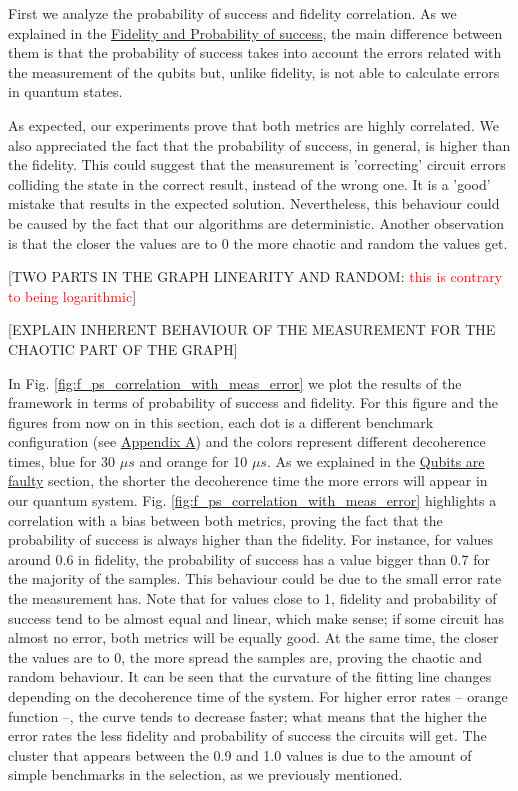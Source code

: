 First we analyze the probability of success and fidelity correlation.
As we explained in the \hyperref[sec:org0c7b2c2]{Fidelity and Probability of success}, the main difference between them is that the probability of success takes into account the errors related with the measurement of the qubits but, unlike fidelity, is not able to calculate errors in quantum states.

As expected, our experiments prove that both metrics are highly correlated.
We also appreciated the fact that the probability of success, in general, is higher than the fidelity.
This could suggest that the measurement is 'correcting' circuit errors colliding the state in the correct result, instead of the wrong one.
It is a 'good' mistake that results in the expected solution.
Nevertheless, this behaviour could be caused by the fact that our algorithms are deterministic.
Another observation is that the closer the values are to 0 the more chaotic and random the values get.



[TWO PARTS IN THE GRAPH  LINEARITY AND RANDOM: \textcolor{red}{this is contrary to being logarithmic}]

[EXPLAIN INHERENT BEHAVIOUR OF THE MEASUREMENT FOR THE CHAOTIC PART OF THE GRAPH]

In Fig. \ref{fig:f_ps_correlation_with_meas_error} we plot the results of the framework in terms of probability of success and fidelity. 
For this figure and the figures from now on in this section, each dot is a different benchmark configuration (see \href{appendix-1.org}{Appendix A}) and the colors represent different decoherence times, blue for 30 \(\mu s\) and orange for 10 \(\mu s\).
As we explained in the \href{quantum_computing.org}{Qubits are faulty} section, the shorter the decoherence time the more errors will appear in our quantum system.
Fig. \ref{fig:f_ps_correlation_with_meas_error} highlights a correlation with a bias between both metrics, proving the fact that the probability of success is always higher than the fidelity.
For instance, for values around 0.6 in fidelity, the probability of success has a value bigger than 0.7 for the majority of the samples.
This behaviour could be due to the small error rate the measurement has.
Note that for values close to 1, fidelity and probability of success tend to be almost equal and linear, which make sense; if some circuit has almost no error, both metrics will be equally good.
At the same time, the closer the values are to 0, the more spread the samples are, proving the chaotic and random behaviour.
It can be seen that the curvature of the fitting line changes depending on the decoherence time of the system.
For higher error rates -- orange function --, the curve tends to decrease faster; what means that the higher the error rates the less fidelity and probability of success the circuits will get.
The cluster that appears between the 0.9 and 1.0 values is due to the amount of simple benchmarks in the selection, as we previously mentioned.

